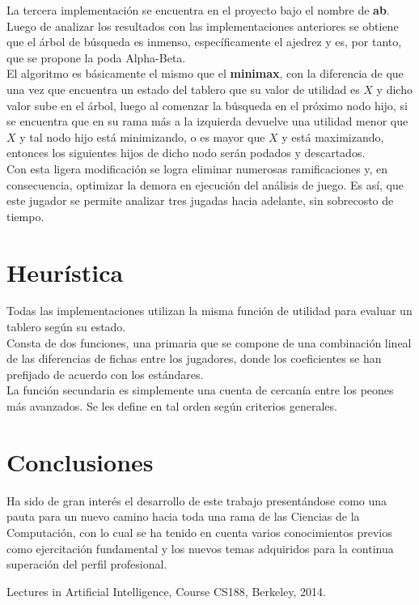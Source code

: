 \documentclass{llncs}
\begin{document}
\begin{multicols}{2}[]
La tercera implementaci\'on se encuentra en el proyecto bajo el nombre de \textbf{ab}.\\
Luego de analizar los resultados con las implementaciones anteriores se obtiene que el \'arbol de b\'usqueda es inmenso, espec\'ificamente
el ajedrez y es, por tanto, que se propone la poda Alpha-Beta.\\
El algoritmo es b\'asicamente el mismo que el \textbf{minimax}, con la diferencia de que una vez que encuentra un estado del tablero que su valor de
utilidad es $X$ y dicho valor sube en el \'arbol, luego al comenzar la b\'usqueda en el pr\'oximo nodo hijo, si se encuentra que en su rama m\'as a la
izquierda devuelve una utilidad menor que $X$ y tal nodo hijo est\'a minimizando, o es mayor que $X$ y est\'a maximizando, entonces los siguientes
hijos de dicho nodo ser\'an podados y descartados.\\
Con esta ligera modificaci\'on se logra eliminar numerosas ramificaciones y, en consecuencia, optimizar la demora en ejecuci\'on del an\'alisis de juego.
Es as\'i, que este jugador se permite analizar tres jugadas hacia adelante, sin sobrecosto de tiempo.

\section{Heur\'istica}

Todas las implementaciones utilizan la misma funci\'on de utilidad para evaluar un tablero seg\'un su estado.\\
Consta de dos funciones, una primaria que se compone de una combinaci\'on lineal de las diferencias de fichas entre los jugadores, donde los coeficientes
se han prefijado de acuerdo con los est\'andares.
\\La funci\'on secundaria es simplemente una cuenta de cercan\'ia entre los peones m\'as avanzados. Se les define en tal orden seg\'un criterios generales.

\section{Conclusiones}\label{sec:Conclusiones}

Ha sido de gran inter\'es el desarrollo de este trabajo present\'andose como una pauta para un nuevo camino hacia toda una rama de las Ciencias de la
Computaci\'on, con lo cual se ha tenido en cuenta varios conocimientos previos como ejercitaci\'on fundamental y los nuevos temas adquiridos para
la continua superaci\'on del perfil profesional.


\end{multicols}
\begin{thebibliography}{1}

Lectures in Artificial Intelligence, Course CS188, Berkeley, 2014.

\end{thebibliography}
\end{document}
